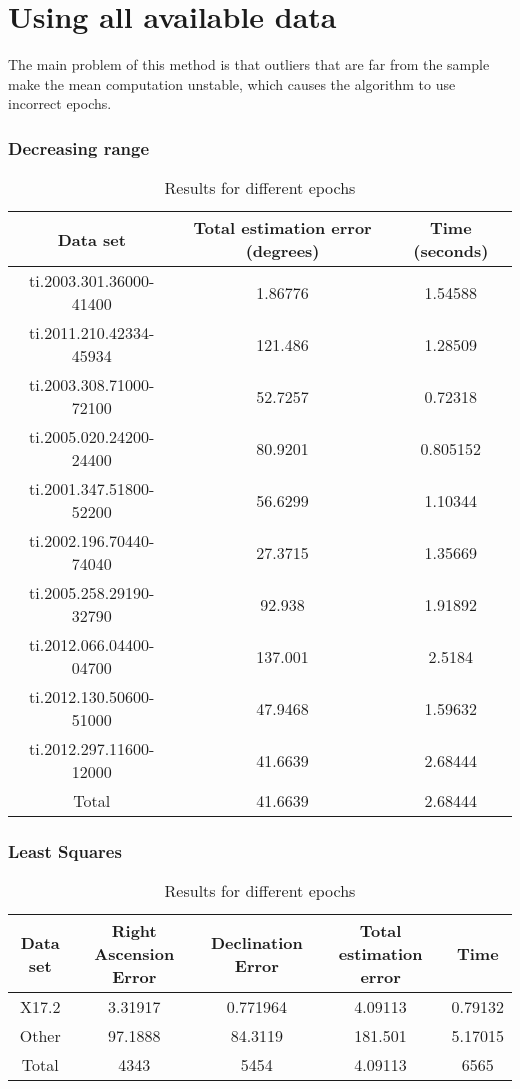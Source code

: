 \section{Using all available data}

The main problem of this method is that outliers that are far from the sample make the mean computation unstable, which causes the algorithm to use incorrect epochs.

\subsubsection{Decreasing range}

\begin{table}[h!]
	\centering
	\def\arraystretch{1.2}
	\begin{tabular}{|c c c|} 
		\hline
		Data set & Total estimation error (degrees) & Time (seconds) \\ [0.5ex] 
		\hline\hline
		ti.2003.301.36000-41400 & 1.86776 & 1.54588 \\
		\hline
		ti.2011.210.42334-45934 & 121.486 & 1.28509 \\
		\hline
		ti.2003.308.71000-72100 & 52.7257 & 0.72318 \\
		\hline
		ti.2005.020.24200-24400 & 80.9201 & 0.805152 \\
		\hline
		ti.2001.347.51800-52200 & 56.6299 & 1.10344 \\
		\hline
		ti.2002.196.70440-74040 & 27.3715 & 1.35669 \\
		\hline
		ti.2005.258.29190-32790 & 92.938 & 1.91892 \\
		\hline
		ti.2012.066.04400-04700 & 137.001 & 2.5184 \\
		\hline
		ti.2012.130.50600-51000 & 47.9468 & 1.59632 \\
		\hline
		ti.2012.297.11600-12000 & 41.6639 & 2.68444 \\
		\hline\hline
		Total & 41.6639 & 2.68444 \\
		\hline
	\end{tabular}
	\caption{Results for different epochs}
\end{table}

\subsubsection{Least Squares}

\begin{table}[h!]
	\centering
	\def\arraystretch{1.2}
	\begin{tabular}{|c c c c c|} 
		\hline
		Data set & Right Ascension Error & Declination Error & Total estimation error & Time \\ [0.5ex] 
		\hline\hline
		X17.2 & 3.31917 & 0.771964 & 4.09113 & 0.79132 \\
		\hline
		Other & 97.1888 & 84.3119 & 181.501 & 5.17015 \\
		\hline\hline
		Total & 4343 & 5454 & 4.09113 & 6565 \\
		\hline
	\end{tabular}
	\caption{Results for different epochs}
\end{table}

